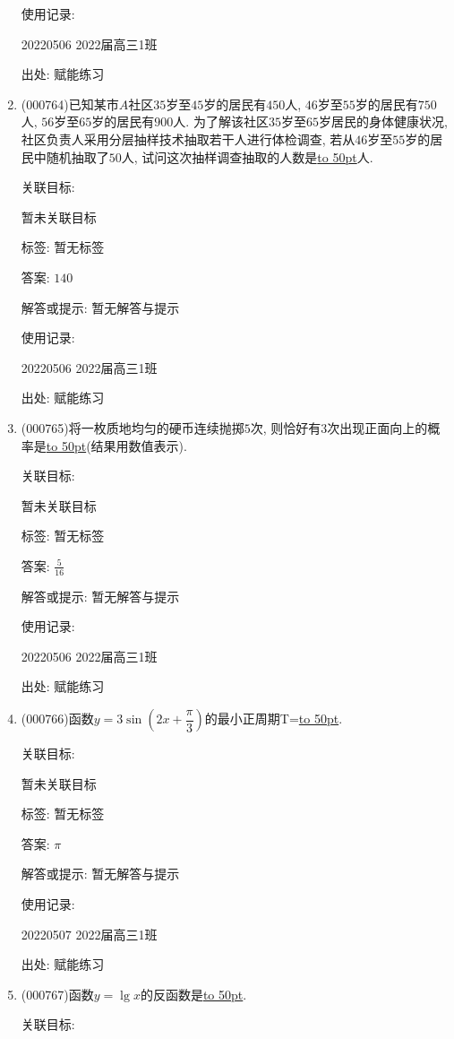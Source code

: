 \documentclass[10pt,a4paper]{article}
\newcommand{\blank}[1]{\underline{\hbox to #1pt{}}}
\begin{document}
\begin{enumerate}[1.]
使用记录:

20220506	2022届高三1班	


出处: 赋能练习
\item { (000764)}已知某市$A$社区$35$岁至$45$岁的居民有$450$人, $46$岁至$55$岁的居民有$750$人, $56$岁至$65$岁的居民有$900$人. 为了解该社区$35$岁至$65$岁居民的身体健康状况, 社区负责人采用分层抽样技术抽取若干人进行体检调查, 若从$46$岁至$55$岁的居民中随机抽取了$50$人, 试问这次抽样调查抽取的人数是\blank{50}人.


关联目标:

暂未关联目标



标签: 暂无标签

答案: $140$

解答或提示: 暂无解答与提示

使用记录:

20220506	2022届高三1班	


出处: 赋能练习
\item { (000765)}将一枚质地均匀的硬币连续抛掷$5$次, 则恰好有$3$次出现正面向上的概率是\blank{50}(结果用数值表示).


关联目标:

暂未关联目标



标签: 暂无标签

答案: $\frac 5{16}$

解答或提示: 暂无解答与提示

使用记录:

20220506	2022届高三1班	


出处: 赋能练习
\item { (000766)}函数$y=3\sin(2x+\dfrac{\pi}3)$的最小正周期T=\blank{50}.


关联目标:

暂未关联目标



标签: 暂无标签

答案: $\pi$

解答或提示: 暂无解答与提示

使用记录:

20220507	2022届高三1班	


出处: 赋能练习
\item { (000767)}函数$y=\lg x$的反函数是\blank{50}.


关联目标:


\end{enumerate}
\end{document}
